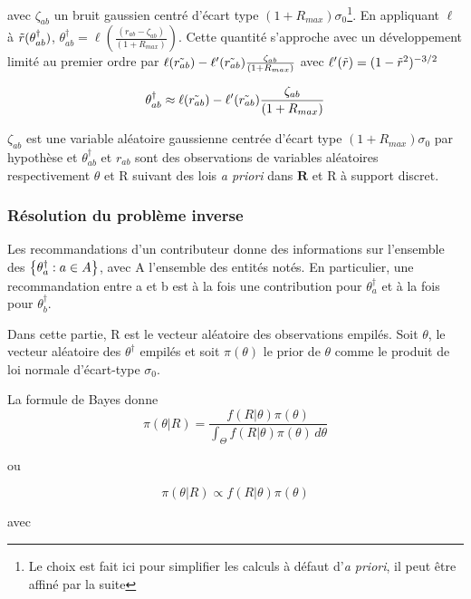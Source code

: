 avec $\zeta_{ab}$ un bruit gaussien centré d'écart type $(1+R_{max})\sigma_0$\footnote{Le choix est fait ici pour simplifier les calculs à défaut d'\textit{a priori}, il peut être affiné par la suite}.
En appliquant $\ell$ à $\Tilde{r}(\theta_{ab}^\dagger)$, $\theta_{ab}^\dagger = \ell (\frac{( r_{ab}-\zeta_{ab})}{(1+R_{max})})$.
Cette quantité s'approche avec un développement limité au premier ordre par $\ell(\Tilde{r_{ab}}) - \ell'(\Tilde{r_{ab}})\frac{\zeta_{ab}}{(1+R_{max})}$ avec $\ell'(\Tilde{r})=(1-\Tilde{r}^2)^{-3/2}$

\begin{equation}
    \theta_{ab}^\dagger \approx \ell(\Tilde{r_{ab}}) - \ell'(\Tilde{r_{ab}})\frac{\zeta_{ab}}{(1+R_{max})}
\end{equation}

$\zeta_{ab}$ est une variable aléatoire gaussienne centrée d'écart type $(1+R_{max})\sigma_0$  par hypothèse
et $\theta_{ab}^\dagger$ et $r_{ab}$ sont des observations de variables aléatoires respectivement $\theta$ et R suivant des lois \textit{a priori} dans $\mathbf{R}$ et R à support discret.

\subsubsection{Résolution du problème inverse}

Les recommandations d'un contributeur donne des informations sur l'ensemble des $\left\lbrace \theta^\dagger_a : a \in A \right\rbrace$, avec A l'ensemble des entités notés.
En particulier, une recommandation entre a et b est à la fois une contribution pour $\theta^\dagger_a$ et à la fois pour $\theta^\dagger_b$.

Dans cette partie, R est le vecteur aléatoire des observations empilés.
Soit $\theta$, le vecteur aléatoire des $\theta^\dagger$ empilés
et soit $\pi(\theta)$ le prior de $\theta$ comme le produit de loi normale d'écart-type $\sigma_0$.

La formule de Bayes donne  
\begin{equation}
\pi(\theta|R) = \frac{f(R|\theta)\pi(\theta)}
{\int_{\Theta} f(R|\theta)\pi(\theta) \,d\theta }
\end{equation}

ou  

\begin{equation}
\pi(\theta|R) \propto f(R|\theta)\pi(\theta)
\end{equation}

avec

